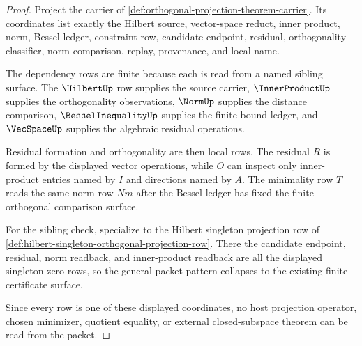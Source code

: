 \begin{proof}
Project the carrier of \autoref{def:orthogonal-projection-theorem-carrier}. Its coordinates list exactly the Hilbert source, vector-space reduct, inner product, norm, Bessel ledger, constraint row, candidate endpoint, residual, orthogonality classifier, norm comparison, replay, provenance, and local name.

The dependency rows are finite because each is read from a named sibling surface. The $\HilbertUp$ row supplies the source carrier, $\InnerProductUp$ supplies the orthogonality observations, $\NormUp$ supplies the distance comparison, $\BesselInequalityUp$ supplies the finite bound ledger, and $\VecSpaceUp$ supplies the algebraic residual operations.

Residual formation and orthogonality are then local rows. The residual $R$ is formed by the displayed vector operations, while $O$ can inspect only inner-product entries named by $I$ and directions named by $A$. The minimality row $T$ reads the same norm row $Nm$ after the Bessel ledger has fixed the finite orthogonal comparison surface.

For the sibling check, specialize to the Hilbert singleton projection row of \autoref{def:hilbert-singleton-orthogonal-projection-row}. There the candidate endpoint, residual, norm readback, and inner-product readback are all the displayed singleton zero rows, so the general packet pattern collapses to the existing finite certificate surface.

Since every row is one of these displayed coordinates, no host projection operator, chosen minimizer, quotient equality, or external closed-subspace theorem can be read from the packet.
\end{proof}


